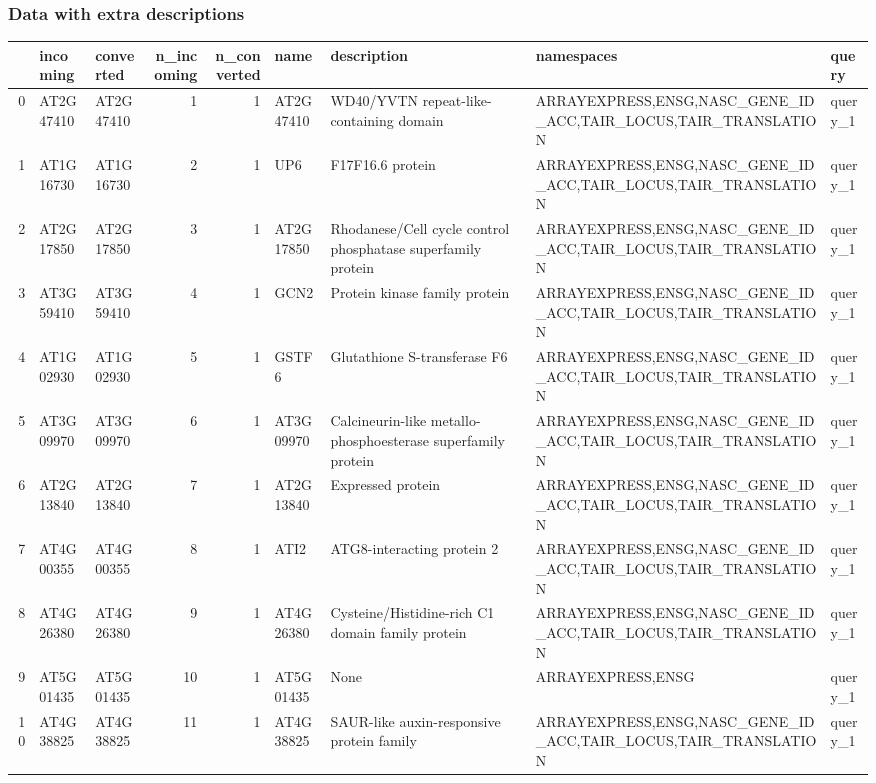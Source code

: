 \documentclass[a4paper]{article}
\begin{document}
\subsubsection{Data with extra descriptions}
\label{sec:org894a806}
\begin{center}
\begin{tabular}{rllrrllll}
 & incoming & converted & n\_incoming & n\_converted & name & description & namespaces & query\\
\hline
0 & AT2G47410 & AT2G47410 & 1 & 1 & AT2G47410 & WD40/YVTN repeat-like-containing domain & ARRAYEXPRESS,ENSG,NASC\_GENE\_ID\_ACC,TAIR\_LOCUS,TAIR\_TRANSLATION & query\_1\\
1 & AT1G16730 & AT1G16730 & 2 & 1 & UP6 & F17F16.6 protein & ARRAYEXPRESS,ENSG,NASC\_GENE\_ID\_ACC,TAIR\_LOCUS,TAIR\_TRANSLATION & query\_1\\
2 & AT2G17850 & AT2G17850 & 3 & 1 & AT2G17850 & Rhodanese/Cell cycle control phosphatase superfamily protein & ARRAYEXPRESS,ENSG,NASC\_GENE\_ID\_ACC,TAIR\_LOCUS,TAIR\_TRANSLATION & query\_1\\
3 & AT3G59410 & AT3G59410 & 4 & 1 & GCN2 & Protein kinase family protein & ARRAYEXPRESS,ENSG,NASC\_GENE\_ID\_ACC,TAIR\_LOCUS,TAIR\_TRANSLATION & query\_1\\
4 & AT1G02930 & AT1G02930 & 5 & 1 & GSTF6 & Glutathione S-transferase F6 & ARRAYEXPRESS,ENSG,NASC\_GENE\_ID\_ACC,TAIR\_LOCUS,TAIR\_TRANSLATION & query\_1\\
5 & AT3G09970 & AT3G09970 & 6 & 1 & AT3G09970 & Calcineurin-like metallo-phosphoesterase superfamily protein & ARRAYEXPRESS,ENSG,NASC\_GENE\_ID\_ACC,TAIR\_LOCUS,TAIR\_TRANSLATION & query\_1\\
6 & AT2G13840 & AT2G13840 & 7 & 1 & AT2G13840 & Expressed protein & ARRAYEXPRESS,ENSG,NASC\_GENE\_ID\_ACC,TAIR\_LOCUS,TAIR\_TRANSLATION & query\_1\\
7 & AT4G00355 & AT4G00355 & 8 & 1 & ATI2 & ATG8-interacting protein 2 & ARRAYEXPRESS,ENSG,NASC\_GENE\_ID\_ACC,TAIR\_LOCUS,TAIR\_TRANSLATION & query\_1\\
8 & AT4G26380 & AT4G26380 & 9 & 1 & AT4G26380 & Cysteine/Histidine-rich C1 domain family protein & ARRAYEXPRESS,ENSG,NASC\_GENE\_ID\_ACC,TAIR\_LOCUS,TAIR\_TRANSLATION & query\_1\\
9 & AT5G01435 & AT5G01435 & 10 & 1 & AT5G01435 & None & ARRAYEXPRESS,ENSG & query\_1\\
10 & AT4G38825 & AT4G38825 & 11 & 1 & AT4G38825 & SAUR-like auxin-responsive protein family & ARRAYEXPRESS,ENSG,NASC\_GENE\_ID\_ACC,TAIR\_LOCUS,TAIR\_TRANSLATION & query\_1\\

\end{tabular}
\end{center}
\end{document}
